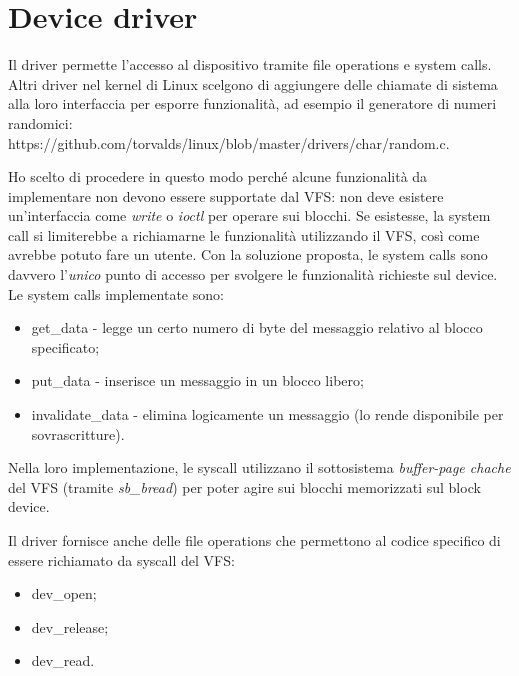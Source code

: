 \documentclass[a4paper,12pt,oneside]{book}
\begin{document}
	\section{Device driver}
	Il driver permette l'accesso al dispositivo tramite file operations e system calls. Altri driver nel kernel di Linux scelgono di aggiungere delle chiamate di sistema alla loro interfaccia per esporre funzionalità, ad esempio il generatore di numeri randomici:\\ https://github.com/torvalds/linux/blob/master/drivers/char/random.c. \\
	\par Ho scelto di procedere in questo modo perché alcune funzionalità da implementare non devono essere supportate dal VFS: non deve esistere un'interfaccia come \emph{write} o \emph{ioctl} per operare sui blocchi. Se esistesse, la system call si limiterebbe a richiamarne le funzionalità utilizzando il VFS, così come avrebbe potuto fare un utente. Con la soluzione proposta, le system calls sono davvero l'\emph{unico} punto di accesso per svolgere le funzionalità richieste sul device. Le system calls implementate sono:
	\begin{itemize}
		\item get\_data - legge un certo numero di byte del messaggio relativo al blocco specificato;
		\item put\_data - inserisce un messaggio in un blocco libero;
		\item invalidate\_data - elimina logicamente un messaggio (lo rende disponibile per sovrascritture).
	\end{itemize}
	Nella loro implementazione, le syscall utilizzano il sottosistema \emph{buffer-page chache} del VFS (tramite \emph{sb\_bread}) per poter agire sui blocchi memorizzati sul block device.\\
	\par Il driver fornisce anche delle file operations che permettono al codice specifico di essere richiamato da syscall del VFS:
	\begin{itemize}
		\item dev\_open;
		\item dev\_release;
		\item dev\_read.
	\end{itemize}
	
	
\end{document}
